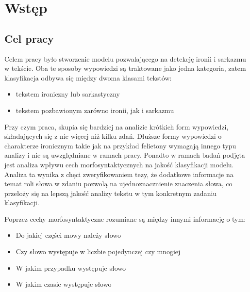 \newpage %
\section{Wstęp}
\subsection{Cel pracy}

Celem pracy było stworzenie modelu pozwalającego na detekcję ironii i sarkazmu w tekście. Oba te sposoby wypowiedzi są traktowane jako jedna kategoria, zatem klasyfikacja odbywa się między dwoma klasami tekstów:

\begin{itemize}
    \item tekstem ironiczny lub sarkastyczny
    \item tekstem pozbawionym zarówno ironii, jak i sarkazmu
\end{itemize}

\noindent Przy czym praca, skupia się bardziej na analizie krótkich form wypowiedzi, składających się z nie więcej niż kilku zdań. Dłuższe formy wypowiedzi o charakterze ironicznym takie jak na przykład felietony wymagają innego typu analizy i nie są uwzględniane w ramach pracy. Ponadto w ramach badań podjęta jest analiza wpływu cech morfosyntaktycznych na jakość klasyfikacji modelu. Analiza ta wynika z chęci zweryfikowaniem tezy, że dodatkowe informacje na temat roli słowa w zdaniu pozwolą na ujednoznacznienie znaczenia słowa, co przełoży się na lepszą jakość analizy tekstu w tym konkretnym zadaniu klasyfikacji.

\noindent Poprzez cechy morfosyntaktyczne rozumiane są między innymi informację o tym\cite[]{Radziszewski2012}:
\begin{itemize}
    \item Do jakiej części mowy należy słowo
    \item Czy słowo występuje w liczbie pojedynczej czy mnogiej
    \item W jakim przypadku występuje słowo
    \item W jakim czasie występuje słowo
\end{itemize}





